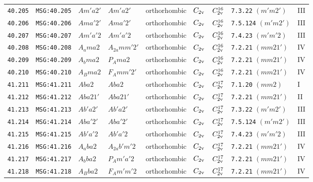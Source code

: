 \documentclass[fleqn,10pt]{jsarticle}
\begin{document}
\begin{center}
\begin{longtable}{lllllllll}
\texttt{40.205} & \texttt{MSG:40.205} & $Am'a2'$ & $Am'a2'$ & orthorhombic & $C_{\rm 2v}$ & $C_{\rm 2v}^{16}$ & \texttt{7.3.22} $(m'm2')$ & III \\
\texttt{40.206} & \texttt{MSG:40.206} & $Ama'2'$ & $Ama'2'$ & orthorhombic & $C_{\rm 2v}$ & $C_{\rm 2v}^{16}$ & \texttt{7.5.124} $(m'm2')$ & III \\
\texttt{40.207} & \texttt{MSG:40.207} & $Am'a'2$ & $Am'a'2$ & orthorhombic & $C_{\rm 2v}$ & $C_{\rm 2v}^{16}$ & \texttt{7.4.23} $(m'm'2)$ & III \\
\texttt{40.208} & \texttt{MSG:40.208} & $A_{a}ma2$ & $A_{2a}mm'2'$ & orthorhombic & $C_{\rm 2v}$ & $C_{\rm 2v}^{16}$ & \texttt{7.2.21} $(mm21')$ & IV \\
\texttt{40.209} & \texttt{MSG:40.209} & $A_{b}ma2$ & $P_{A}ma2$ & orthorhombic & $C_{\rm 2v}$ & $C_{\rm 2v}^{16}$ & \texttt{7.2.21} $(mm21')$ & IV \\
\texttt{40.210} & \texttt{MSG:40.210} & $A_{B}ma2$ & $F_{A}mm'2'$ & orthorhombic & $C_{\rm 2v}$ & $C_{\rm 2v}^{16}$ & \texttt{7.2.21} $(mm21')$ & IV \\ \hline
\texttt{41.211} & \texttt{MSG:41.211} & $Aba2$ & $Aba2$ & orthorhombic & $C_{\rm 2v}$ & $C_{\rm 2v}^{17}$ & \texttt{7.1.20} $(mm2)$ & I \\
\texttt{41.212} & \texttt{MSG:41.212} & $Aba21'$ & $Aba21'$ & orthorhombic & $C_{\rm 2v}$ & $C_{\rm 2v}^{17}$ & \texttt{7.2.21} $(mm21')$ & II \\
\texttt{41.213} & \texttt{MSG:41.213} & $Ab'a2'$ & $Ab'a2'$ & orthorhombic & $C_{\rm 2v}$ & $C_{\rm 2v}^{17}$ & \texttt{7.3.22} $(m'm2')$ & III \\
\texttt{41.214} & \texttt{MSG:41.214} & $Aba'2'$ & $Aba'2'$ & orthorhombic & $C_{\rm 2v}$ & $C_{\rm 2v}^{17}$ & \texttt{7.5.124} $(m'm2')$ & III \\
\texttt{41.215} & \texttt{MSG:41.215} & $Ab'a'2$ & $Ab'a'2$ & orthorhombic & $C_{\rm 2v}$ & $C_{\rm 2v}^{17}$ & \texttt{7.4.23} $(m'm'2)$ & III \\
\texttt{41.216} & \texttt{MSG:41.216} & $A_{a}ba2$ & $A_{2a}b'm'2$ & orthorhombic & $C_{\rm 2v}$ & $C_{\rm 2v}^{17}$ & \texttt{7.2.21} $(mm21')$ & IV \\
\texttt{41.217} & \texttt{MSG:41.217} & $A_{b}ba2$ & $P_{A}m'a'2$ & orthorhombic & $C_{\rm 2v}$ & $C_{\rm 2v}^{17}$ & \texttt{7.2.21} $(mm21')$ & IV \\
\texttt{41.218} & \texttt{MSG:41.218} & $A_{B}ba2$ & $F_{A}m'm'2$ & orthorhombic & $C_{\rm 2v}$ & $C_{\rm 2v}^{17}$ & \texttt{7.2.21} $(mm21')$ & IV \\ \hline

\end{longtable}
\end{center}
\end{document}
